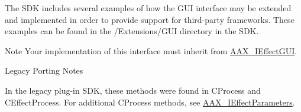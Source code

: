 The S\+DK includes several examples of how the G\+UI interface may be extended and implemented in order to provide support for third-\/party frameworks. These examples can be found in the /\+Extensions/\+G\+UI directory in the S\+DK.

\begin{DoxyNote}{Note}
Your implementation of this interface must inherit from \mbox{\hyperlink{a01821}{A\+A\+X\+\_\+\+I\+Effect\+G\+UI}}.
\end{DoxyNote}
\begin{DoxyRefDesc}{Legacy Porting Notes}
\item[\mbox{\hyperlink{a00787__porting_notes000030}{Legacy Porting Notes}}]In the legacy plug-\/in S\+DK, these methods were found in C\+Process and C\+Effect\+Process. For additional C\+Process methods, see \mbox{\hyperlink{a01825}{A\+A\+X\+\_\+\+I\+Effect\+Parameters}}.\end{DoxyRefDesc}
